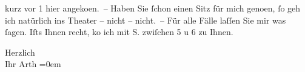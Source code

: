                kurz vor 1 hier angeko{\geminationm}en. – Haben Sie{ }ſchon einen Sitz für mich geno{\geminationm}en,{ }ſo geh ich natürlich
               ins Theater – nicht – nicht. – Für alle Fälle laſſen Sie mir was{ }ſagen. {\pb}Iſts Ihnen recht, ko{\geminationm} ich
               mit \textsc{S.} zwiſchen 5 u 6 zu Ihnen.\pend
           
\pstart
           Herzlich{\\[\baselineskip]}Ihr \spacefill\mbox{Arth}\pend
           \leftskip=0em{}\endnumbering{}  \newcommand{\dateiname}{L00469}\newcommand{\titel}{Arthur Schnitzler an Richard Beer-Hofmann, [5. 8. 1895?]}\newcommand{\editorInnen}{Martin Anton Müller und Gerd-Hermann Susen}
